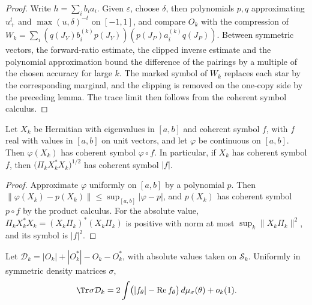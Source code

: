 \begin{proof}\leanok
    Write $h=\sum_ib_ia_i$. Given $\varepsilon$, choose $\delta$, then polynomials $p,q$
    approximating $u_+^t$ and $\max(u,\delta)^{-t}$ on $[-1,1]$, and compare $O_k$ with the
    compression of $W_k=\sum_i(q(J_Y)b_i^{(k)}p(J_Y))(p(J_P)a_i^{(k)}q(J_P))$. Between
    symmetric vectors, the forward-ratio estimate, the clipped inverse estimate and the
    polynomial approximation bound the difference of the pairings by a multiple of the
    chosen accuracy for large $k$. The marked symbol of $W_k$ replaces each star by the
    corresponding marginal, and the clipping is removed on the one-copy side by the
    preceding lemma. The trace limit then follows from the coherent symbol calculus.
\end{proof}

\begin{lemma}
    \label{lem:coherent_symbol_function}
    \leanok
    Let $X_k$ be Hermitian with eigenvalues in $[a,b]$ and coherent symbol $f$, with $f$
    real with values in $[a,b]$ on unit vectors, and let $\varphi$ be continuous on $[a,b]$.
    Then $\varphi(X_k)$ has coherent symbol $\varphi\circ f$. In particular, if $X_k$ has
    coherent symbol $f$, then $\bigl(\Pi_kX_k^\ast X_k\bigr)^{1/2}$ has coherent symbol $|f|$.
\end{lemma}

\begin{proof}\leanok
    Approximate $\varphi$ uniformly on $[a,b]$ by a polynomial $p$. Then
    $\|\varphi(X_k)-p(X_k)\|\le\sup_{[a,b]}|\varphi-p|$, and $p(X_k)$ has coherent symbol
    $p\circ f$ by the product calculus. For the absolute value, $\Pi_kX_k^\ast X_k
    =(X_k\Pi_k)^\ast(X_k\Pi_k)$ is positive with norm at most $\sup_k\|X_k\Pi_k\|^2$, and
    its symbol is $|f|^2$.
\end{proof}

\begin{theorem}
    \label{thm:skew_symbol}
    \leanok
    Let $\mathcal D_k=|O_k|+|O_k^\ast|-O_k-O_k^\ast$, with absolute values taken on
    $\mathcal S_k$. Uniformly in symmetric density matrices $\sigma$,
    \[
        \Tr\sigma\mathcal D_k=2\int\bigl(|f_\theta|-\operatorname{Re}f_\theta\bigr)
        \,d\mu_\sigma(\theta)+o_k(1).
    \]
\end{theorem}

